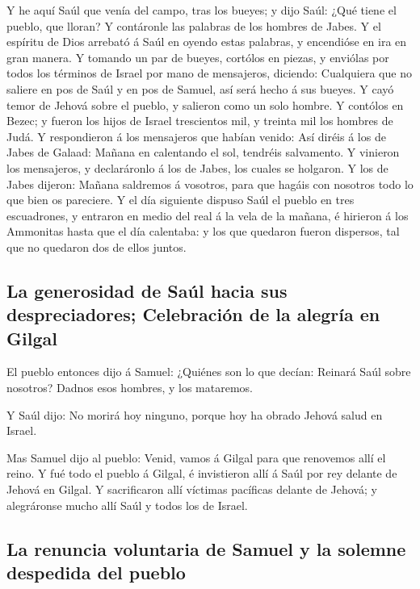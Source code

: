  Y he aquí Saúl que venía del campo, tras los bueyes; y
dijo Saúl: ¿Qué tiene el pueblo, que lloran? Y contáronle las palabras
de los hombres de Jabes.  Y el espíritu de Dios arrebató á
Saúl en oyendo estas palabras, y encendióse en ira en gran manera.
 Y tomando un par de bueyes, cortólos en piezas, y
enviólas por todos los términos de Israel por mano de mensajeros,
diciendo: Cualquiera que no saliere en pos de Saúl y en pos de Samuel,
así será hecho á sus bueyes. Y cayó temor de Jehová sobre el pueblo, y
salieron como un solo hombre.  Y contólos en Bezec; y
fueron los hijos de Israel trescientos mil, y treinta mil los hombres de
Judá.  Y respondieron á los mensajeros que habían venido:
Así diréis á los de Jabes de Galaad: Mañana en calentando el sol,
tendréis salvamento. Y vinieron los mensajeros, y declaráronlo á los de
Jabes, los cuales se holgaron.  Y los de Jabes dijeron:
Mañana saldremos á vosotros, para que hagáis con nosotros todo lo que
bien os pareciere.  Y el día siguiente dispuso Saúl el
pueblo en tres escuadrones, y entraron en medio del real á la vela de la
mañana, é hirieron á los Ammonitas hasta que el día calentaba: y los que
quedaron fueron dispersos, tal que no quedaron dos de ellos juntos.

\hypertarget{la-generosidad-de-sauxfal-hacia-sus-despreciadores-celebraciuxf3n-de-la-alegruxeda-en-gilgal}{%
\subsection{La generosidad de Saúl hacia sus despreciadores; Celebración
de la alegría en
Gilgal}\label{la-generosidad-de-sauxfal-hacia-sus-despreciadores-celebraciuxf3n-de-la-alegruxeda-en-gilgal}}

 El pueblo entonces dijo á Samuel: ¿Quiénes son lo que
decían: Reinará Saúl sobre nosotros? Dadnos esos hombres, y los
mataremos.

 Y Saúl dijo: No morirá hoy ninguno, porque hoy ha obrado
Jehová salud en Israel.

 Mas Samuel dijo al pueblo: Venid, vamos á Gilgal para
que renovemos allí el reino.  Y fué todo el pueblo á
Gilgal, é invistieron allí á Saúl por rey delante de Jehová en Gilgal. Y
sacrificaron allí víctimas pacíficas delante de Jehová; y alegráronse
mucho allí Saúl y todos los de Israel.

\hypertarget{la-renuncia-voluntaria-de-samuel-y-la-solemne-despedida-del-pueblo}{%
\subsection{La renuncia voluntaria de Samuel y la solemne despedida del
pueblo}\label{la-renuncia-voluntaria-de-samuel-y-la-solemne-despedida-del-pueblo}}

